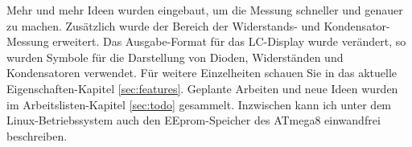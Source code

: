 Mehr und mehr Ideen wurden eingebaut, um die Messung schneller und genauer zu machen.
Zusätzlich wurde der Bereich der Widerstands- und Kondensator-Messung erweitert.
Das Ausgabe-Format für das LC-Display wurde verändert, so wurden Symbole für die Darstellung von
Dioden, Widerständen und Kondensatoren verwendet.
Für weitere Einzelheiten schauen Sie in das aktuelle Eigenschaften-Kapitel \ref{sec:features}.
Geplante Arbeiten und neue Ideen wurden im Arbeitslisten-Kapitel \ref{sec:todo} gesammelt.
Inzwischen kann ich unter dem Linux-Betriebssystem auch den EEprom-Speicher des ATmega8 einwandfrei beschreiben.

